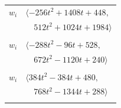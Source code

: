 \documentclass[11pt]{article}
\begin{document}
\begin{longtable}{@{}ll@{}}
$w_i$ & $\langle -256t^{2}+1408t+448,$\\
 & $\quad 512t^{2}+1024t+1984\rangle$\\
\addlinespace[2pt]
\multicolumn{2}{@{}p{0.97\textwidth}@{}}{$i=40$, $D_i=4$, $e_i=0$, $\rho_{ij}$: $0{:}1, \allowbreak 1{:}3, \allowbreak 9{:}3, \allowbreak 12{:}2, \allowbreak 14{:}1, \allowbreak 19{:}2, \allowbreak 20{:}3, \allowbreak 23{:}2, \allowbreak 24{:}2, \allowbreak 35{:}3$}\\
$w_i$ & $\langle -288t^{2}-96t+528,$\\
 & $\quad 672t^{2}-1120t+240\rangle$\\
\addlinespace[2pt]
\multicolumn{2}{@{}p{0.97\textwidth}@{}}{$i=41$, $D_i=8$, $e_i=2$, $\rho_{ij}$: $0{:}2, \allowbreak 1{:}1, \allowbreak 6{:}1, \allowbreak 8{:}2, \allowbreak 9{:}1, \allowbreak 11{:}3, \allowbreak 14{:}3, \allowbreak 17{:}1, \allowbreak 18{:}1, \allowbreak 19{:}2, \allowbreak 36{:}1, \allowbreak 37{:}1$}\\
$w_i$ & $\langle 384t^{2}-384t+480,$\\
 & $\quad 768t^{2}-1344t+288\rangle$\\
\addlinespace[2pt]
\end{longtable}
\endgroup
\end{document}
